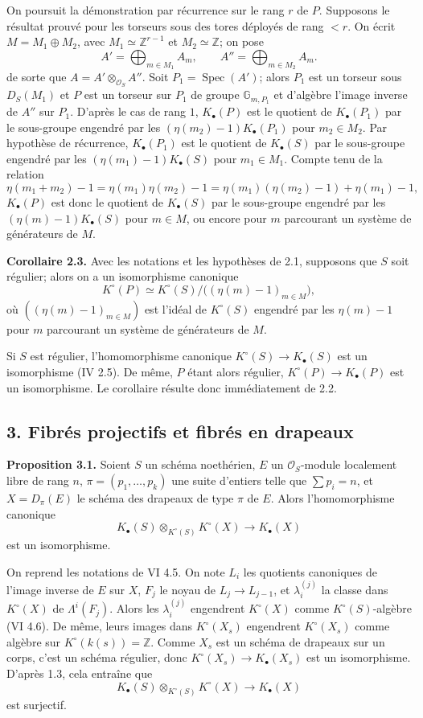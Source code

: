 \documentclass[11pt]{article}
\newcommand{\Spec}{\operatorname{Spec}}
\begin{document}
On poursuit la démonstration par récurrence sur le rang $r$ de $P$. Supposons le résultat prouvé pour les torseurs sous des tores déployés de rang $<r$. On écrit $M=M_1\oplus M_2$, avec $M_1\simeq\mathbb Z^{r-1}$ et $M_2\simeq\mathbb Z$; on pose
\[
A'=\bigoplus_{m\in M_1}A_m,\qquad
A''=\bigoplus_{m\in M_2}A_m.
\]
de sorte que $A=A'\otimes_{\mathcal O_S}A''$. Soit $P_1=\Spec(A')$; alors $P_1$ est un torseur sous $D_S(M_1)$ et $P$ est un torseur sur $P_1$ de groupe $\mathbb G_{m,P_1}$ et d'algèbre l'image inverse de $A''$ sur $P_1$. D'après le cas de rang $1$, $K_\bullet(P)$ est le quotient de $K_\bullet(P_1)$ par le sous-groupe engendré par les $(\eta(m_2)-1)K_\bullet(P_1)$ pour $m_2\in M_2$. Par hypothèse de récurrence, $K_\bullet(P_1)$ est le quotient de $K_\bullet(S)$ par le sous-groupe engendré par les $(\eta(m_1)-1)K_\bullet(S)$ pour $m_1\in M_1$. Compte tenu de la relation
\[
\eta(m_1+m_2)-1=\eta(m_1)\eta(m_2)-1
=\eta(m_1)(\eta(m_2)-1)+\eta(m_1)-1,
\]
$K_\bullet(P)$ est donc le quotient de $K_\bullet(S)$ par le sous-groupe engendré par les $(\eta(m)-1)K_\bullet(S)$ pour $m\in M$, ou encore pour $m$ parcourant un système de générateurs de $M$.

\textbf{Corollaire 2.3.} Avec les notations et les hypothèses de 2.1, supposons que $S$ soit régulier; alors on a un isomorphisme canonique
\[
K^\circ(P)\simeq K^\circ(S)/\bigl((\eta(m)-1)_{m\in M}\bigr),
\]
où $((\eta(m)-1)_{m\in M})$ est l'idéal de $K^\circ(S)$ engendré par les $\eta(m)-1$ pour $m$ parcourant un système de générateurs de $M$.

Si $S$ est régulier, l'homomorphisme canonique $K^\circ(S)\to K_\bullet(S)$ est un isomorphisme (IV 2.5). De même, $P$ étant alors régulier, $K^\circ(P)\to K_\bullet(P)$ est un isomorphisme. Le corollaire résulte donc immédiatement de 2.2.

\subsection*{3. Fibrés projectifs et fibrés en drapeaux}

\textbf{Proposition 3.1.} Soient $S$ un schéma noethérien, $E$ un $\mathcal O_S$-module localement libre de rang $n$, $\pi=(p_1,\ldots,p_k)$ une suite d'entiers telle que $\sum p_i=n$, et $X=D_\pi(E)$ le schéma des drapeaux de type $\pi$ de $E$. Alors l'homomorphisme canonique
\[
K_\bullet(S)\otimes_{K^\circ(S)}K^\circ(X)\longrightarrow K_\bullet(X)
\]
est un isomorphisme.

On reprend les notations de VI 4.5. On note $L_i$ les quotients canoniques de l'image inverse de $E$ sur $X$, $F_j$ le noyau de $L_j\to L_{j-1}$, et $\lambda_i^{(j)}$ la classe dans $K^\circ(X)$ de $\Lambda^i(F_j)$. Alors les $\lambda_i^{(j)}$ engendrent $K^\circ(X)$ comme $K^\circ(S)$-algèbre (VI 4.6). De même, leurs images dans $K^\circ(X_s)$ engendrent $K^\circ(X_s)$ comme algèbre sur $K^\circ(k(s))=\mathbb Z$. Comme $X_s$ est un schéma de drapeaux sur un corps, c'est un schéma régulier, donc $K^\circ(X_s)\to K_\bullet(X_s)$ est un isomorphisme. D'après 1.3, cela entraîne que
\[
K_\bullet(S)\otimes_{K^\circ(S)}K^\circ(X)\longrightarrow K_\bullet(X)
\]
est surjectif.
\end{document}
